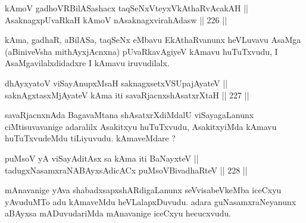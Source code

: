 \begin{shl}
kAmoV gadhoVR\s BilASashacx taqSeNxVteyxVkAthaRvAcakAH || \\
\footnotemark[1]AsaknagxpUvaRkaH kAmoV nA\s \s saknagxvirahAdasw \hfill || 226 ||  
\end{shl}

\begin{artha}
kAma, gadhaR, aBilASa, taqSeNx eMbavu EkAthaRvanunx
heVLuvavu AsaMga (aBiniveVsha mithAyxjAcnxna) pUvaRkavAgiyeV kAmavu
huTuTxvudu, I AsaMgavilalxdidadxre I kAmavu iruvudilalx.
\end{artha}


\begin{shl}
dhAyxyatoV viSayAnupxMsaH saknagxsetxVSUpajAyateV || \\
saknAgxtasxMjAyateV kAma iti savaRjacnxshAsatxrXtaH \hfill || 227 ||  
\end{shl}

\begin{artha}
savaRjacnxnAda BagavaMtana shAsatxrXdiMdalU viSayagaLanunx
ciMtisuvavanige adaralilx Asakitxyu huTuTxvudu, AsakitxyiMda kAmavu
huTuTxvudeMdu tiLiyuvudu. kAmaveMdare ?
\end{artha}

\begin{shl}
puMsoV yA viSayAditAsx sa kAma iti BaNayxteV || \\
tadugxNasamxraNABAyxsAdicACx puMsoV\s BivadhaRteV \hfill || 228 ||  
\end{shl}

\begin{artha}
mAnavanige yAva shabadxsapxshARdigaLanunx seVvisabeVkeMba iceCxyu
yAvuduMTo adu kAmaveMdu heVLalapxDuvudu. adara guNasamxraNeyanunx
aBAyxsa mADuvudariMda mAnavanige iceCxyu hecucxvudu.
\end{artha}

